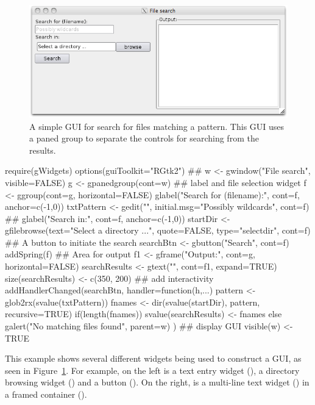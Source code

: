 \begin{figure}
  \centering
  \includegraphics[width=.8\textwidth]{fig-file-search.png}
  \caption{A simple GUI for search for files matching a pattern. This
    GUI uses a paned group to separate the controls for searching from
    the results.}
  \label{fig:file-search}
\end{figure}

\begin{Schunk}
\begin{Sinput}
 require(gWidgets)
 options(guiToolkit="RGtk2")
 ## 
 w <- gwindow("File search", visible=FALSE)
 g <- gpanedgroup(cont=w)
 ## label and file selection widget
 f <- ggroup(cont=g, horizontal=FALSE)
 glabel("Search for (filename):", cont=f, anchor=c(-1,0))
 txtPattern <- gedit("", initial.msg="Possibly wildcards", 
                     cont=f)
 ##
 glabel("Search in:", cont=f, anchor=c(-1,0))
 startDir <- gfilebrowse(text="Select a directory ...",
                         quote=FALSE,
                         type="selectdir", cont=f)
 ## A button to initiate the search
 searchBtn <- gbutton("Search", cont=f)
 addSpring(f)
 ## Area for output
 f1 <- gframe("Output:", cont=g, horizontal=FALSE)
 searchResults <- gtext("", cont=f1, expand=TRUE)
 size(searchResults) <- c(350, 200)
 ## add interactivity
 addHandlerChanged(searchBtn, handler=function(h,...) {
   pattern <- glob2rx(svalue(txtPattern))
   fnames <- dir(svalue(startDir), pattern, recursive=TRUE)
   if(length(fnames))
     svalue(searchResults) <- fnames
   else
     galert("No matching files found", parent=w)
 })
 ## display GUI
 visible(w) <- TRUE
\end{Sinput}
\end{Schunk}

This example shows several different widgets being used to construct a
GUI, as seen in Figure~\ref{fig:file-search}. For example, on the
left is a text entry widget (), a directory browsing
widget () and a button (). On the
right, is a multi-line text widget () in a framed
container ().

